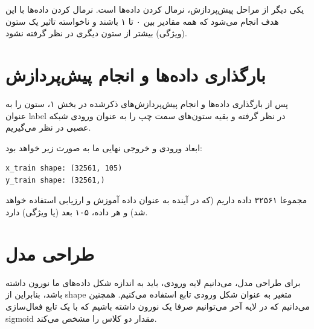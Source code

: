 \documentclass{article}
\begin{document}
یکی دیگر از مراحل پیش‌پردازش، نرمال کردن داده‌ها است. نرمال کردن داده‌ها با این هدف انجام می‌شود که همه مقادیر بین ۰ تا ۱ باشند و ناخواسته تاثیر یک ستون (ویژگی) بیشتر از ستون دیگری در نظر گرفته نشود.



\let\oldsection\section
\renewcommand\section{\clearpage\oldsection}





\section{
بارگذاری داده‌ها و انجام پیش‌پردازش
}


پس از بارگذاری داده‌ها و انجام پیش‌پردازش‌های ذکرشده در بخش ۱، ستون  را به عنوان label در نظر گرفته و بقیه ستون‌های سمت چپ را به عنوان ورودی شبکه عصبی در نظر می‌گیریم.

ابعاد ورودی و خروجی نهایی ما به صورت زیر خواهد بود:


\begin{latin}
\begin{lstlisting}
x_train shape: (32561, 105)
y_train shape: (32561,)
\end{lstlisting}
\end{latin}

مجموعا ۳۲۵۶۱ داده داریم (که در آینده به عنوان داده آموزش و ارزیابی استفاده خواهد شد) و هر داده، ۱۰۵ بعد (یا ویژگی) دارد.




\section{
طراحی مدل
}

برای طراحی مدل، می‌دانیم لایه ورودی، باید به اندازه شکل داده‌های ما نورون داشته باشد، بنابراین از shape متغیر  به عنوان شکل ورودی تابع استفاده می‌کنیم. همچنین می‌دانیم که در لایه آخر می‌توانیم صرفا یک نورون داشته باشیم که با یک تابع فعال‌سازی sigmoid مقدار دو کلاس را مشخص می‌کند.
\end{document}
